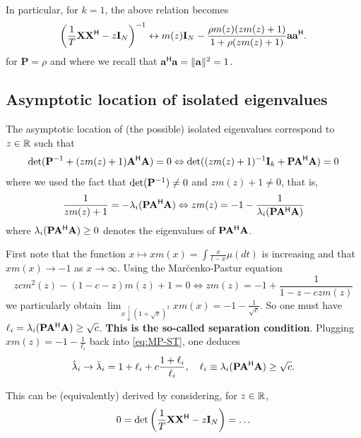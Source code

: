 \documentclass[11pt,a4paper]{article}
\begin{document}
In particular, for $k=1$, the above relation becomes
\begin{equation}
	\left(\frac1T \X \X^\H - z \I_N \right)^{-1} \leftrightarrow m(z) \I_N - \frac{\rho m(z) (z m(z) + 1) }{ 1 + \rho(z m(z) + 1) } \mathbf{a a}^\H.
\end{equation}
for $\mathbf{P} = \rho$ and where we recall that $\mathbf{a}^\H \mathbf{a} = \| \mathbf{a} \|^2 = 1$.


\subsection{Asymptotic location of isolated eigenvalues}

The asymptotic location of (the possible) isolated eigenvalues correspond to $z \in \RR$ such that
\begin{equation}
	\det( \P^{-1} + (z m(z) + 1) \A^\H \A ) = 0 \Leftrightarrow \det( (z m(z) + 1)^{-1} \I_k +  \mathbf{P} \A^\H \A ) = 0
\end{equation}
where we used the fact that $\det(\P^{-1}) \neq 0$ and $z m(z) + 1 \neq 0$, that is, 
\begin{equation}
	\frac1{z m(z) + 1} = -\lambda_i(\mathbf{P} \A^\H \A) \Leftrightarrow zm (z) = -1 - \frac1{\lambda_i(\mathbf{P} \A^\H \A)}
\end{equation}
where $\lambda_i(\mathbf{P} \A^\H \A) \geq 0$ denotes the eigenvalues of $\mathbf{P} \A^\H \A$.

First note that the function $x \mapsto xm(x) = \int \frac{x}{t-x} \mu(dt)$ is increasing and that $xm(x) \to -1$ as $x \to \infty$. Using the Mar\u{c}enko-Pastur equation
\begin{equation}\label{eq:MP-ST}
	zcm^2(z)-(1-c-z)m(z)+1=0 \Leftrightarrow zm(z) = -1 + \frac1{1-z-czm(z)}
\end{equation}
we particularly obtain $\lim_{x \downarrow (1+\sqrt c)^2} xm(x) = - 1 - \frac1{\sqrt c}$. So one must have $\ell_i = \lambda_i(\mathbf{P} \A^\H \A) \geq \sqrt c$. \textbf{This is the so-called separation condition}. Plugging $xm(z) = -1 - \frac1{\ell_i}$ back into \eqref{eq:MP-ST}, one deduces
\begin{equation}
	\hat \lambda_i \to \bar \lambda_i = 1 + \ell_i + c \frac{1+\ell_i}{\ell_i}, \quad \ell_i \equiv \lambda_i(\mathbf{P} \A^\H \A) \geq \sqrt c.
\end{equation}




\medskip

This can be (equivalently) derived by considering, for $z \in \RR$,
\begin{align*}
		0 = \det \left( \frac1T \X \X^\H - z \I_N  \right) = \ldots
\end{align*}
\end{document}
